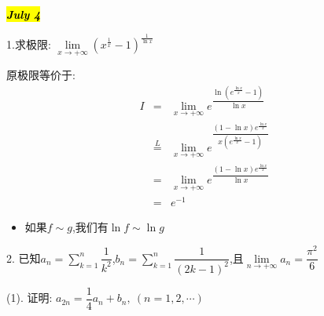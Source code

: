 \hl{\textbf{\textit{July 4}}}

1.求极限: $\lim\limits_{x\rightarrow+\infty}(x^{\frac{1}{x}}-1)^{\frac{1}{\ln x}}$
\begin{solution}
	
	原极限等价于: 
	\begin{eqnarray*}
		I&=&\lim\limits_{x\rightarrow+\infty}e^{\dfrac{\ln(e^{\frac{\ln x}{x}}-1)}{\ln x}}\\
		&\overset{L}{=}&\lim\limits_{x\rightarrow+\infty}e^{\dfrac{(1-\ln x)e^{\frac{\ln x}{x}}}{x(e^{\frac{\ln x}{x}}-1)}}\\
		&=&\lim\limits_{x\rightarrow+\infty}e^{\dfrac{(1-\ln x)e^{\frac{\ln x}{x}}}{\ln x}}\\
		&=&e^{-1}
	\end{eqnarray*}
	\begin{anymark}[注]
		\begin{itemize}
			\item 如果$f\sim g$,我们有$\ln f\sim \ln g$
		\end{itemize}
	\end{anymark}
\end{solution}

2. 已知$a_{n}=\sum\limits_{k=1}^{n}\dfrac{1}{k^2}$,$b_{n}=\sum\limits_{k=1}^{n}\dfrac{1}{(2k-1)^2}$,且$\lim\limits_{n\rightarrow +\infty}a_{n}=\dfrac{\pi^2}{6}$

(1). 证明: $a_{2n}=\dfrac{1}{4}a_{n}+b_{n},\ (n=1,2,\cdots)$

